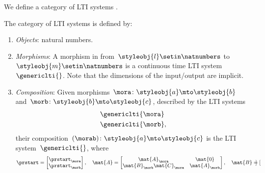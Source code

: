 We define a category of LTI systems \LTI.

\begin{ctdefinition}
    \label{def:LTICat}
    The category \LTI of LTI systems is defined by:
    \begin{enumerate}
        \item \emph{Objects}: natural numbers.
        \item \emph{Morphisms}: A morphism in \LTI from~$\styleobj{l}\setin \natnumbers$ to~$\styleobj{m}\setin \natnumbers$ is a continuous time LTI system~$\genericlti{}$.
              Note that the dimensions of the input/output are implicit.
        \item \emph{Composition}: Given morphisms~$\mora \colon \styleobj{a}\mto \styleobj{b}$ and~$\morb\colon \styleobj{b}\mto \styleobj{c}$, described by the LTI systems
              \begin{equation}
                  \begin{aligned}
                       & \genericlti{\mora} \\
                       & \genericlti{\morb},
                  \end{aligned}
              \end{equation}
              their composition~$(\morab)\colon \styleobj{a}\mto \styleobj{c}$ is the LTI system~$\genericlti{}$, where
              \begin{equation}
                  \begin{aligned}
                      \prstart & =\begin{bmatrix}
                                      \prstart_\mora \\
                                      \prstart_\morb \\
                                  \end{bmatrix},\quad
                      \mat{A}=\begin{bmatrix}
                                  \mat{A}_\mora              & \mat{0}       \\
                                  \mat{B}_\morb\mat{C}_\mora & \mat{A}_\morb
                              \end{bmatrix},\quad
                      \mat{B}=\begin{bmatrix}

\end{bmatrix}
\end{aligned}
\end{equation}
\end{enumerate}
\end{ctdefinition}
